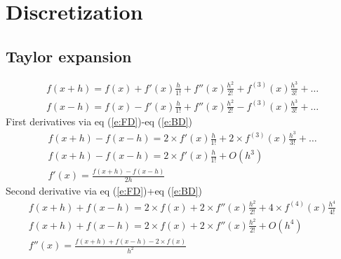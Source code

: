 \documentclass[11pt,dvips]{article}
\numberwithin{equation}{section}
\begin{document}
\section{Discretization}
\subsection{Taylor expansion}
%
\begin{gather}
f(x+h)=f(x)+f'(x)\frac{h}{1!}+f''(x)\frac{h^2}{2!}+f^{(3)}(x)\frac{h^3}{3!}+ \ldots  \label{e:FD} \\
f(x-h)=f(x)-f'(x)\frac{h}{1!}+f''(x)\frac{h^2}{2!}-f^{(3)}(x)\frac{h^3}{3!}+ \ldots  \label{e:BD} 
\end{gather}
%
First derivatives via eq (\ref{e:FD})-eq (\ref{e:BD})
%
\begin{gather}
f(x+h)-f(x-h)=2\times f'(x)\frac{h}{1!}+2 \times f^{(3)}(x)\frac{h^3}{3!}+ \ldots \nonumber \\
f(x+h)-f(x-h)=2\times f'(x)\frac{h}{1!}+O(h^3) \nonumber \\
f'(x)=\frac{f(x+h)-f(x-h)}{2h}  \label{e:f_1d}
\end{gather}
%
Second derivative via eq (\ref{e:FD})+eq (\ref{e:BD})
%
\begin{gather}
f(x+h)+f(x-h)=2\times f(x)+2 \times f''(x)\frac{h^2}{2!}+4 \times f^{(4)}(x)
\frac{h^4}{4!} \nonumber \\
f(x+h)+f(x-h)=2\times f(x)+2 \times f''(x)\frac{h^2}{2!}+O(h^4) \nonumber \\
f''(x)=\frac{f(x+h)+f(x-h)-2\times f(x)}{h^2} \label{e:f_2d}
\end{gather}
%
\end{document}
